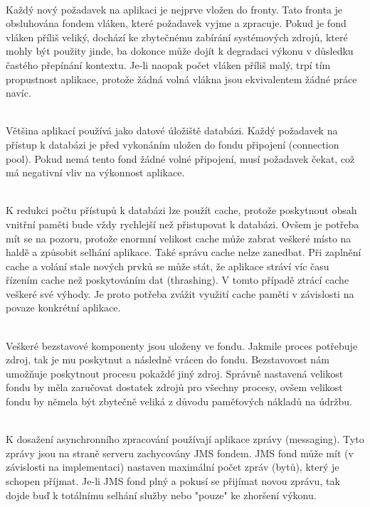 \documentclass[122pt,oneside]{fithesis}
\begin{document}
\vspace{5 mm}
\\\indent Každý nový požadavek na aplikaci je nejprve vložen do fronty. Tato fronta je obsluhována fondem vláken, které požadavek vyjme a zpracuje. Pokud je fond vláken příliš veliký, dochází ke zbytečnému zabírání systémových zdrojů, které mohly být použity jinde, ba dokonce může dojít k degradaci výkonu v důsledku častého přepínání kontextu. Je-li naopak počet vláken příliš malý, trpí tím propustnost aplikace, protože žádná volná vlákna jsou ekvivalentem žádné práce navíc.

\vspace{5 mm}
\\\indent Většina aplikací používá jako datové úložiště databázi. Každý požadavek na přístup k databázi je před vykonáním uložen do fondu připojení (connection pool). Pokud nemá tento fond žádné volné připojení, musí požadavek čekat, což má negativní vliv na výkonnost aplikace.

\vspace{5 mm}
\\\indent K redukci počtu přístupů k databázi lze použít cache, protože poskytnout obsah vnitřní paměti bude vždy rychlejší než přistupovat k databázi. Ovšem je potřeba mít se na pozoru, protože enormní velikost cache může zabrat veškeré místo na haldě a způsobit selhání aplikace. Také správu cache nelze zanedbat. Při zaplnění cache a volání stale nových prvků se může stát, že aplikace stráví víc času řízením cache než poskytováním dat (thrashing). V tomto případě ztrácí cache veškeré své výhody. Je proto potřeba zvážit využití cache paměti v závislosti na povaze konkrétní aplikace. 

\vspace{5 mm}
\\\indent Veškeré bezstavové komponenty jsou uloženy ve fondu. Jakmile proces potřebuje zdroj, tak je mu poskytnut a následně vrácen do fondu. Bezstavovost nám umožňuje poskytnout procesu pokaždé jiný zdroj. Správně nastavená velikost fondu by měla zaručovat dostatek zdrojů pro všechny procesy, ovšem velikost fondu by němela být zbytečně veliká z důvodu paměťových nákladů na údržbu.

\vspace{5 mm}
\\\indent K dosažení asynchronního zpracování používají aplikace zprávy (messaging). Tyto zprávy jsou na straně serveru zachycovány JMS fondem. JMS fond může mít (v závislosti na implementaci) nastaven maximální počet zpráv (bytů), který je schopen příjmat. Je-li JMS fond plný a pokusí se přijímat novou zprávu, tak dojde buď k totálnímu selhání služby nebo "pouze" ke zhoršení výkonu.
\end{document}
